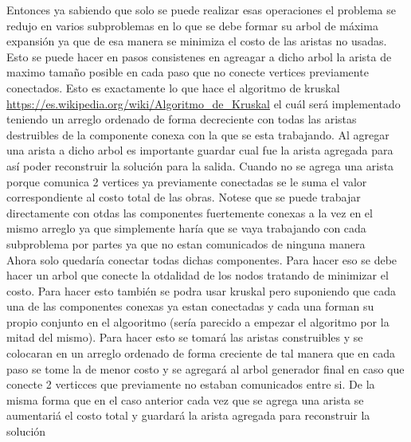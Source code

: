Entonces ya sabiendo que solo se puede realizar esas operaciones el problema se redujo en varios subproblemas en lo que se debe formar su arbol de máxima expansión ya que de esa manera se minimiza el costo de las aristas no usadas. Esto se puede hacer en pasos consistenes en agreagar a dicho arbol la arista de maximo tamaño posible en cada paso que no conecte vertices previamente conectados. Esto es exactamente lo que hace el algoritmo de kruskal \url{https://es.wikipedia.org/wiki/Algoritmo_de_Kruskal} el cuál será implementado teniendo un arreglo ordenado de forma decreciente con todas las aristas destruibles de la componente conexa con la que se esta trabajando. Al agregar una arista a dicho arbol es importante guardar cual fue la arista agregada para así poder reconstruir la solución para la salida. Cuando no se agrega una arista porque comunica 2 vertices ya previamente conectadas se le suma el valor correspondiente al costo total de las obras. Notese que se puede trabajar directamente con otdas las componentes fuertemente conexas a la vez en el mismo arreglo ya que simplemente haría que se vaya trabajando con cada subproblema por partes ya que no estan comunicados de ninguna manera\\
Ahora solo quedaría conectar todas dichas componentes. Para hacer eso se debe hacer un arbol que conecte la otdalidad de los nodos tratando de minimizar el costo. Para hacer esto también se podra usar kruskal pero suponiendo que cada una de las componentes conexas ya estan conectadas y cada una forman su propio conjunto en el algooritmo (sería parecido a empezar el algoritmo por la mitad del mismo). Para hacer esto se tomará las aristas construibles y se colocaran en un arreglo ordenado de forma creciente de tal manera que en cada paso se tome la de menor costo y se agregará al arbol generador final en caso que conecte 2 verticces que previamente no estaban comunicados entre si. De la misma forma que en el caso anterior cada vez que se agrega una arista se aumentariá el costo total y guardará la arista agregada para reconstruir la solución\\


